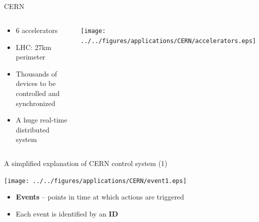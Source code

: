 \documentclass[compress,red]{beamer}
\begin{document}
\subsection{}
\begin{frame}{CERN}

\begin{columns}[c]
    \begin{center}

      \begin{itemize}
	\item 6 accelerators
	\item LHC: 27km perimeter
	\item Thousands of devices to be controlled and synchronized
	\item A huge real-time distributed system
      \end{itemize}

    \end{center}
    \begin{center}
      \texttt{[image: ../../figures/applications/CERN/accelerators.eps]}
    \end{center}
\end{columns}

\end{frame}
\begin{frame}{A simplified explanation of CERN control system (1)}

      \begin{center}
      \texttt{[image: ../../figures/applications/CERN/event1.eps]}
      \end{center}

  \begin{itemize}
    \item {\bf Events} -- points in time at which actions are triggered
    \item Each event is identified by an {\bf ID}
  \end{itemize}

\end{frame}
\end{document}
